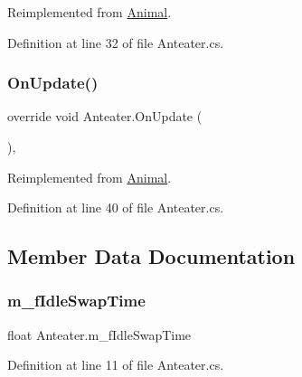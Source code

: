 Reimplemented from \mbox{\hyperlink{class_animal_a8ed14f752254b7033466bbd0c846a972}{Animal}}.



Definition at line 32 of file Anteater.\+cs.

\mbox{\label{class_anteater_a51eaca4815562f28e36517999ed5b77f}} 
\subsubsection{\texorpdfstring{On\+Update()}{OnUpdate()}}
{\footnotesize\ttfamily override void Anteater.\+On\+Update (\begin{DoxyParamCaption}{ }\end{DoxyParamCaption})\hspace{0.3cm}{\ttfamily [protected]}, {\ttfamily [virtual]}}



Reimplemented from \mbox{\hyperlink{class_animal_a0b0cf85dbc03ad6ed1878e90c2ac84b1}{Animal}}.



Definition at line 40 of file Anteater.\+cs.



\subsection{Member Data Documentation}
\mbox{\label{class_anteater_a6607e1bdc99981d48478a5c213c5dbc7}} 
\subsubsection{\texorpdfstring{m\+\_\+f\+Idle\+Swap\+Time}{m\_fIdleSwapTime}}
{\footnotesize\ttfamily float Anteater.\+m\+\_\+f\+Idle\+Swap\+Time}



Definition at line 11 of file Anteater.\+cs.

\mbox{\label{class_anteater_aa2254c4952bfd178fd5faafdefe4d67e}} 
